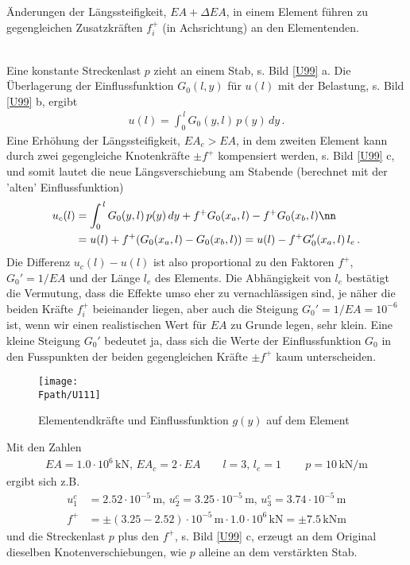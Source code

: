 {{{{\hspace*{-12pt}\colorbox{hellgrau}{\parbox{0.98\textwidth}{\"{A}nderungen der L\"{a}ngssteifigkeit, $EA + \Delta EA $, in einem Element f\"{u}hren zu gegengleichen Zusatzkr\"{a}ften $f_i^+$ (in Achsrichtung) an den Elementenden.}}\\
Eine konstante Streckenlast $p$ zieht an einem Stab, s. Bild \ref{U99} a. Die \"{U}berlagerung der Einflussfunktion $G_0(l,y)$ f\"{u}r $u(l)$ mit der Belastung, s. Bild \ref{U99} b, ergibt
\begin{align}
u(l) = \int_0^{\,l} G_0(y,l)\,p(y)\,dy\,.
\end{align}
Eine Erh\"{o}hung der L\"{a}ngssteifigkeit, $EA_c > EA$, in dem zweiten Element kann durch zwei gegengleiche Knotenkr\"{a}fte $\pm f^+$ kompensiert werden, s. Bild \ref{U99} c, und somit lautet die neue L\"{a}ngsverschiebung am Stabende (berechnet mit der 'alten' Einflussfunktion)
\begin{align}
u_c(l) &= \int_0^{\,l} G_0(y,l)\,p(y)\,dy + f^+ G_0(x_a,l) - f^+ G_0(x_b,l)\nn \\
&= u(l) + f^+ (G_0(x_a,l) - G_0(x_b,l)) = u(l) - f^+ G_0'(x_a,l)\,l_e\,.
\end{align}
Die Differenz $u_c(l) - u(l)$ ist also proportional zu den Faktoren $f^+$, $G_0' = 1/EA$ und der L\"{a}nge $l_e$ des Elements. Die Abh\"{a}ngigkeit von $l_e$ best\"{a}tigt die Vermutung, dass die Effekte umso eher zu vernachl\"{a}ssigen sind, je n\"{a}her die beiden Kr\"{a}fte $f_i^+$ beieinander liegen, aber auch die Steigung $G_0' = 1/EA = 10^{-6}$ ist, wenn wir einen realistischen Wert f\"{u}r $EA$ zu Grunde legen, sehr klein. Eine kleine Steigung $G_0'$ bedeutet ja, dass sich die Werte der Einflussfunktion $G_0$ in den Fusspunkten der beiden gegengleichen Kr\"{a}fte $\pm f^+$ kaum unterscheiden.
\begin{figure}[tbp]
\centering
\texttt{[image: \\Fpath/U111]}
\caption{Elementendkr\"{a}fte und Einflussfunktion $g(y)$ auf dem Element}
\label{U111}
%
\end{figure}%


Mit den Zahlen
\begin{align}
EA = 1.0 \cdot 10^6 \,\text{kN},\,EA_c = 2 \cdot EA\qquad  l = 3,\,l_e = 1\, \qquad p = 10\,\text{kN}/\text{m}
\end{align}
ergibt sich z.B.
\begin{align}
u_1^c &= 2.52\cdot 10^{-5}\,\text{m},\,  u_2^c = 3.25 \cdot 10^{-5}\,\text{m},\,  u_3^c = 3.74 \cdot 10^{-5}\,\text{m} \\
 f^+ &= \pm (3.25 - 2.52)\cdot 10^{-5}\,\text{m}\cdot 1.0\cdot 10^6\,\text{kN} = \pm 7.5\,\text{kNm}
\end{align}
und die Streckenlast $p$ plus den $f^+$, s. Bild \ref{U99} c, erzeugt an dem Original dieselben Knotenverschiebungen, wie $p$ alleine an dem verst\"{a}rkten Stab.
\\

}}}}
